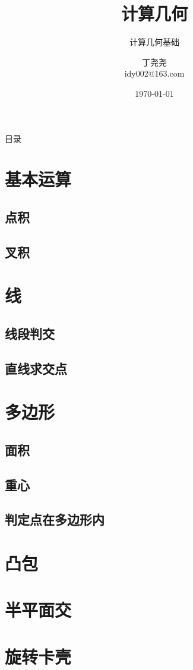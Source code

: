 \documentclass{beamer}
\title{计算几何}
\subtitle{计算几何基础}
\author{丁尧尧 \\ idy002@163.com}
\institute{上海交通大学}
\date{\today}
\begin{document}
	\maketitle
	\begin{frame}{目录}
		\tableofcontents
	\end{frame}
	
	\section{基本运算}
		\subsection{点积}
		\subsection{叉积}
	\section{线}
		\subsection{线段判交}
		\subsection{直线求交点}
	\section{多边形}
		\subsection{面积}
		\subsection{重心}
		\subsection{判定点在多边形内}
	\section{凸包}
	\section{半平面交}
	\section{旋转卡壳}
\end{document}
